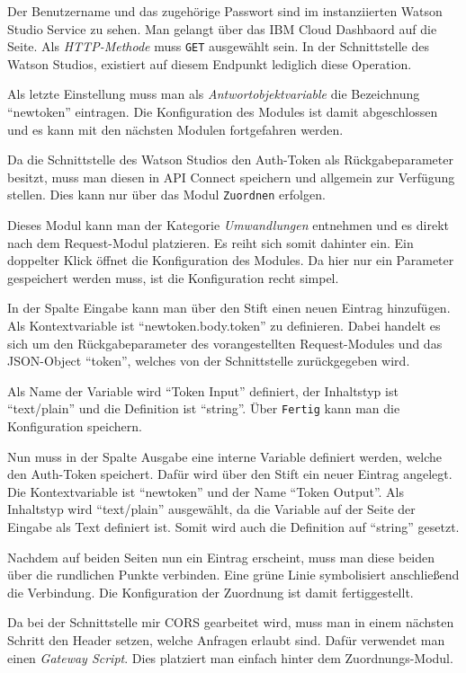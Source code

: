 Der Benutzername und das zugehörige Passwort sind im instanziierten Watson Studio Service zu sehen. Man gelangt über das
IBM Cloud Dashbaord auf die Seite. Als \textit{HTTP-Methode} muss \texttt{GET} ausgewählt sein. In der Schnittstelle des
Watson Studios, existiert auf diesem Endpunkt lediglich diese Operation.

Als letzte Einstellung muss man als \textit{Antwortobjektvariable} die Bezeichnung \enquote{newtoken} eintragen. Die
Konfiguration des Modules ist damit abgeschlossen und es kann mit den nächsten Modulen fortgefahren werden.

Da die Schnittstelle des Watson Studios den Auth-Token als Rückgabeparameter besitzt, muss man diesen in API Connect
speichern und allgemein zur Verfügung stellen. Dies kann nur über das Modul \texttt{Zuordnen} erfolgen.

Dieses Modul kann man der Kategorie \textit{Umwandlungen} entnehmen und es direkt nach dem Request-Modul platzieren. Es
reiht sich somit dahinter ein. Ein doppelter Klick öffnet die Konfiguration des Modules. Da hier nur ein Parameter
gespeichert werden muss, ist die Konfiguration recht simpel.

In der Spalte Eingabe kann man über den Stift einen neuen Eintrag hinzufügen. Als Kontextvariable ist
\enquote{newtoken.body.token} zu definieren. Dabei handelt es sich um den Rückgabeparameter des vorangestellten
Request-Modules und das JSON-Object \enquote{token}, welches von der Schnittstelle zurückgegeben wird.

Als Name der Variable wird \enquote{Token Input} definiert, der Inhaltstyp ist \enquote{text/plain} und die Definition
ist \enquote{string}. Über \texttt{Fertig} kann man die Konfiguration speichern.

Nun muss in der Spalte Ausgabe eine interne Variable definiert werden, welche den Auth-Token speichert. Dafür wird über
den Stift ein neuer Eintrag angelegt. Die Kontextvariable ist \enquote{newtoken} und der Name \enquote{Token Output}.
Als Inhaltstyp wird \enquote{text/plain} ausgewählt, da die Variable auf der Seite der Eingabe als Text definiert ist.
Somit wird auch die Definition auf \enquote{string} gesetzt.

Nachdem auf beiden Seiten nun ein Eintrag erscheint, muss man diese beiden über die rundlichen Punkte verbinden. Eine
grüne Linie symbolisiert anschließend die Verbindung. Die Konfiguration der Zuordnung ist damit fertiggestellt.

Da bei der Schnittstelle mir CORS gearbeitet wird, muss man in einem nächsten Schritt den Header setzen, welche Anfragen
erlaubt sind. Dafür verwendet man einen \textit{Gateway Script}. Dies platziert man einfach hinter dem Zuordnungs-Modul.

